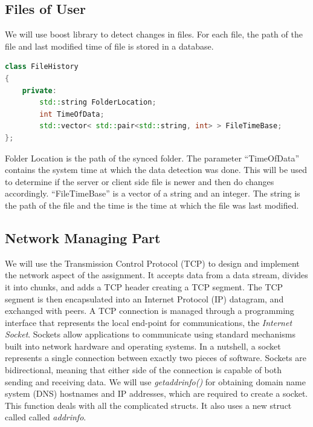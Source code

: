 \documentclass{article}
\begin{document}
			\subsection{Files of User}

			We will use boost library to detect changes in files. For each file, the path of the file and last modified time of file is stored in a database.

			\begin{lstlisting}[language=C++, caption={Class Parameters for File History}]
class FileHistory
{
	private:
		std::string FolderLocation;
		int TimeOfData;
		std::vector< std::pair<std::string, int> > FileTimeBase;
};
			\end{lstlisting}

			Folder Location is the path of the synced folder. The parameter ``TimeOfData'' contains the system time at which the data detection was done. This will be used to determine if the server or client side file is newer and then do changes accordingly. ``FileTimeBase'' is a vector of a string and an integer. The string is the path of the file and the time is the time at which the file was last modified.
			
			\subsection{Network Managing Part}
				We will use the Transmission Control Protocol (TCP) to design and implement the network aspect of the assignment. It accepts data from a data stream, divides it into chunks, and adds a TCP header creating a TCP segment. The TCP segment is then encapsulated into an Internet Protocol (IP) datagram, and exchanged with peers. A TCP connection is managed through a programming interface that represents the local end-point for communications, the \textit{Internet Socket}. Sockets allow applications to communicate using standard mechanisms built into network hardware and operating systems. In a nutshell, a socket represents a single connection between exactly two pieces of software. Sockets are bidirectional, meaning that either side of the connection is capable of both sending and receiving data.
				\newline
				We will use \textit{getaddrinfo()} for obtaining domain name system (DNS) hostnames and IP addresses, which are required to create a socket.  This function deals with all the complicated structs. It also uses a new struct called called \textit{addrinfo}. 
\end{document}
